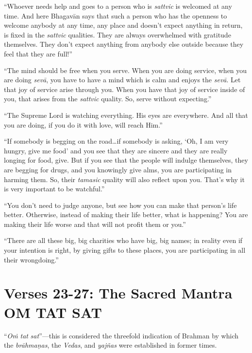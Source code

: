 \enquote{Whoever needs help and goes to a person who is \textit{sattvic} is welcomed at any time. And here Bhagavān says that such a person who has the openness to welcome anybody at any time, any place and doesn’t expect anything in return, is fixed in the \textit{sattvic} qualities. They are always overwhelmed with gratitude themselves. They don’t expect anything from anybody else outside because they feel that they are full!}

\enquote{The mind should be free when you serve. When you are doing service, when you are doing \textit{sevā}, you have to have a mind which is calm and enjoys the \textit{sevā}. Let that joy of service arise through you. When you have that joy of service inside of you, that arises from the \textit{sattvic} quality. So, serve without expecting.}

\enquote{The Supreme Lord is watching everything. His eyes are everywhere. And all that you are doing, if you do it with love, will reach Him.}

\enquote{If somebody is begging on the road\ldots if somebody is asking, \enquote{Oh, I am very hungry, give me food} and you see that they are sincere and they are really longing for food, give. But if you see that the people will indulge themselves, they are begging for drugs, and you knowingly give alms, you are participating in harming them. So, their \textit{tamasic} quality will also reflect upon you. That’s why it is very important to be watchful.}

\enquote{You don’t need to judge anyone, but see how you can make that person’s life better. Otherwise, instead of making their life better, what is happening? You are making their life worse and that will not profit them or you.}

\enquote{There are all these big, big charities who have big, big names; in reality even if your intention is right, by giving gifts to these places, you are participating in all their wrongdoing.}

\section{Verses 23-27: The Sacred Mantra OṀ TAT SAT}\label{sec-verses-23-27-the-sacred-mantra-om-tat-sat}

{\enquote{\textit{Oṁ} \textit{tat} \textit{sat}}---this is considered the threefold indication of Brahman by which the \textit{brāhmaṇas}, the \textit{Vedas}, and \textit{yajñas} were established in former times.}



